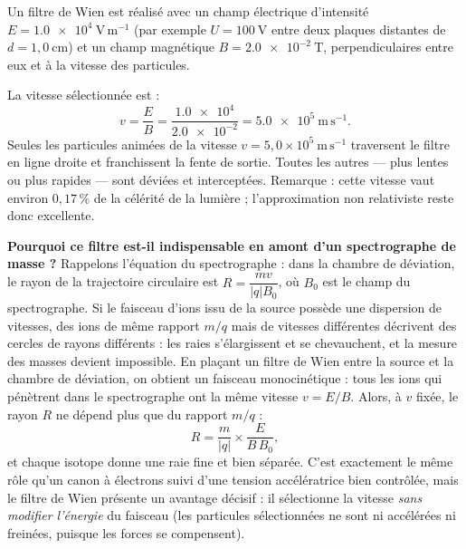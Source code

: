 \documentclass[11pt]{article}
\newcommand{\cle}[1]{{\popxbold\color{popdark}#1}}
\begin{document}
\begin{exemplebox}
Un filtre de Wien est réalisé avec un champ électrique d'intensité $E = \num{1,0e4}\ \mathrm{V\,m^{-1}}$ (par exemple $U = 100\ \mathrm{V}$ entre deux plaques distantes de $d = 1{,}0\ \mathrm{cm}$) et un champ magnétique $B = \num{2,0e-2}\ \mathrm{T}$, perpendiculaires entre eux et à la vitesse des particules.

La vitesse sélectionnée est :
\[ v = \dfrac{E}{B} = \dfrac{\num{1,0e4}}{\num{2,0e-2}} = \num{5,0e5}\ \mathrm{m\,s^{-1}}. \]
Seules les particules animées de la vitesse $v = 5{,}0\times10^{5}\ \mathrm{m\,s^{-1}}$ traversent le filtre en ligne droite et franchissent la fente de sortie. Toutes les autres — plus lentes ou plus rapides — sont déviées et interceptées. Remarque : cette vitesse vaut environ $0{,}17\,\%$ de la célérité de la lumière ; l'approximation non relativiste reste donc excellente.
\end{exemplebox}

\textbf{Pourquoi ce filtre est-il indispensable en amont d'un spectrographe de masse ?} Rappelons l'équation du spectrographe : dans la chambre de déviation, le rayon de la trajectoire circulaire est $R = \dfrac{mv}{|q|B_0}$, où $B_0$ est le champ du spectrographe. Si le faisceau d'ions issu de la source possède une dispersion de vitesses, des ions de même rapport $m/q$ mais de vitesses différentes décrivent des cercles de rayons différents : les raies s'élargissent et se chevauchent, et la mesure des masses devient impossible. En plaçant un filtre de Wien entre la source et la chambre de déviation, on obtient un faisceau \cle{monocinétique} : tous les ions qui pénètrent dans le spectrographe ont la même vitesse $v = E/B$. Alors, à $v$ fixée, le rayon $R$ ne dépend plus que du rapport $m/q$ :
\[ R = \dfrac{m}{|q|}\times\dfrac{E}{B\,B_0}, \]
et chaque isotope donne une raie fine et bien séparée. C'est exactement le même rôle qu'un canon à électrons suivi d'une tension accélératrice bien contrôlée, mais le filtre de Wien présente un avantage décisif : il sélectionne la vitesse \emph{sans modifier l'énergie} du faisceau (les particules sélectionnées ne sont ni accélérées ni freinées, puisque les forces se compensent).
\end{document}
